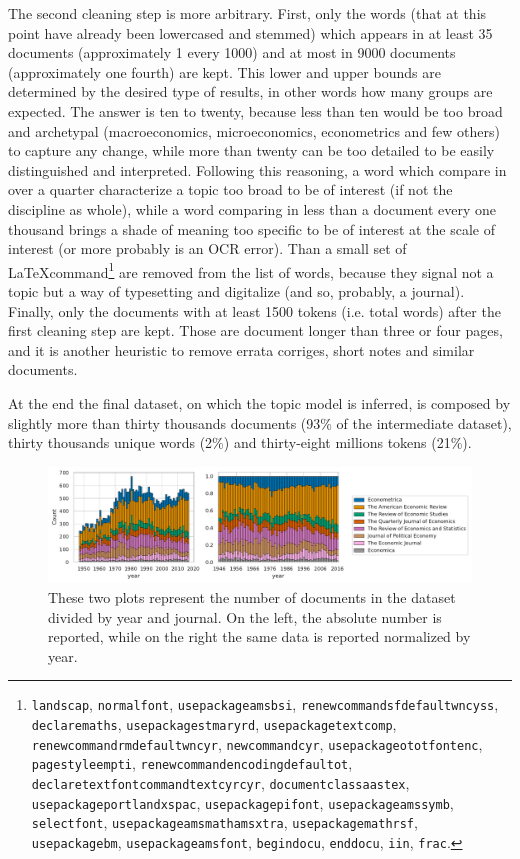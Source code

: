 \documentclass[a4paper, 11pt, headings=standardclasses, tablecaptionsbelow]{scrartcl}
\begin{document}
The second cleaning step is more arbitrary.
First, only the words (that at this point have already been lowercased and stemmed) which appears in at least 35 documents (approximately 1 every 1000) and at most in 9000 documents (approximately one fourth) are kept. This lower and upper bounds are determined by the desired type of results, in other words how many groups are expected. The answer is ten to twenty, because less than ten would be too broad and archetypal (macroeconomics, microeconomics, econometrics and few others) to capture any change, while more than twenty can be too detailed to be easily distinguished and interpreted. Following this reasoning, a word which compare in over a quarter characterize a topic too broad to be of interest (if not the discipline as whole), while a word comparing in less than a document every one thousand brings a shade of meaning too specific to be of interest at the scale of interest (or more probably is an OCR error). Than a small set of \LaTeX command\footnote{\texttt{landscap}, \texttt{normalfont}, \texttt{usepackageamsbsi}, \texttt{renewcommandsfdefaultwncyss}, \texttt{declaremaths}, \texttt{usepackagestmaryrd}, \texttt{usepackagetextcomp}, \texttt{renewcommandrmdefaultwncyr}, \texttt{newcommandcyr}, \texttt{usepackageototfontenc}, \texttt{pagestyleempti}, \texttt{renewcommandencodingdefaultot}, \texttt{declaretextfontcommandtextcyrcyr}, \texttt{documentclassaastex}, \texttt{usepackageportlandxspac}, \texttt{usepackagepifont}, \texttt{usepackageamssymb}, \texttt{selectfont}, \texttt{usepackageamsmathamsxtra}, \texttt{usepackagemathrsf}, \texttt{usepackagebm}, \texttt{usepackageamsfont}, \texttt{begindocu}, \texttt{enddocu}, \texttt{iin}, \texttt{frac}.} are removed from the list of words, because they signal not a topic but a way of typesetting and digitalize (and so, probably, a journal).
Finally, only the documents with at least 1500 tokens (i.e. total words) after the first cleaning step are kept. Those are document longer than three or four pages, and it is another heuristic to remove errata corriges, short notes and similar documents.

At the end the final dataset, on which the topic model is inferred, is composed by slightly more than thirty thousands documents (93\% of the intermediate dataset), thirty thousands unique words (2\%) and thirty-eight millions tokens (21\%).

\begin{figure}[tb]
  \centering
  \includegraphics[width=\textwidth]{src/journals.pdf}
  \caption[Number of documents per journal and year]{These two plots represent the number of documents in the dataset divided by year and journal. On the left, the absolute number is reported, while on the right the same data is reported normalized by year.}
  \label{fig:journals}
\end{figure}
\end{document}

